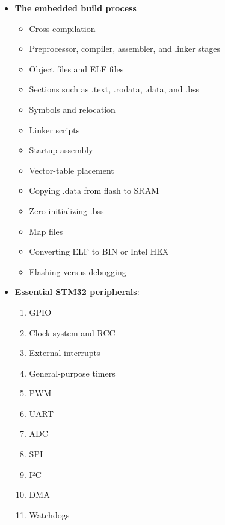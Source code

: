 \documentclass{report}
\begin{document}
\begin{itemize}
\begin{itemize}
                \item Floating-point unit
                \item Little-endian representation
                \item Thumb and Thumb-2 instructions
            \end{itemize}
        \item \textbf{The embedded build process}
            \begin{itemize}
                \item Cross-compilation
                \item Preprocessor, compiler, assembler, and linker stages
                \item Object files and ELF files
                \item Sections such as .text, .rodata, .data, and .bss
                \item Symbols and relocation
                \item Linker scripts
                \item Startup assembly
                \item Vector-table placement
                \item Copying .data from flash to SRAM
                \item Zero-initializing .bss
                \item Map files
                \item Converting ELF to BIN or Intel HEX
                \item Flashing versus debugging
            \end{itemize}
        \item \textbf{Essential STM32 peripherals}: 
            \begin{enumerate}
                \item GPIO
                \item Clock system and RCC
                \item External interrupts
                \item General-purpose timers
                \item PWM
                \item UART
                \item ADC
                \item SPI
                \item I²C
                \item DMA
                \item Watchdogs

\end{enumerate}
\end{itemize}
\end{document}
